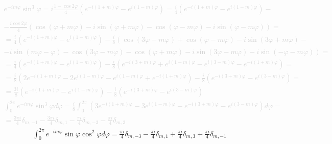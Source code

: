 %
\textcolor{lightgray}{ \begin{equation*} \begin{aligned}
e^{-i m \varphi} \sin^3 \varphi = 
i \frac{1 - \cos 2 \varphi}{4}
\left( e^{-i(1+m)\varphi} - e^{i(1-m)\varphi} \right) = 
\frac{i}{4} \left( e^{-i(1+m)\varphi} - e^{i(1-m)\varphi} \right) - \\
\\ - \frac{i \cos 2 \varphi}{4} \left( 
\cos (\varphi + m \varphi) - i \sin (\varphi + m \varphi) - 
\cos (\varphi - m \varphi) - i \sin (\varphi - m \varphi) \right) = \\
= \frac{i}{4} \left( e^{-i(1+m)\varphi} - e^{i(1-m)\varphi} \right) - 
\frac{i}{8} \left( \cos (3 \varphi + m \varphi) +
\cos (\varphi - m \varphi) - i \sin (3 \varphi + m \varphi) \right. - \\
- \left. i \sin (m \varphi - \varphi) - \cos (3 \varphi - m \varphi) - 
\cos (\varphi + m \varphi) - i \sin (3 \varphi - m \varphi) - 
i \sin (- \varphi - m \varphi) \right) = \\
= \frac{i}{4} \left( e^{-i(1+m)\varphi} - e^{i(1-m)\varphi} \right) - 
\frac{i}{8} \left( e^{-i (3+m) \varphi} + e^{i (1-m) \varphi}
- e^{i (3-m) \varphi} - e^{-i (1+m) \varphi} \right) = \\
= \frac{i}{8} \left( 2 e^{-i(1+m)\varphi} - 2 e^{i(1-m)\varphi} - 
e^{i(1-m)\varphi} + e^{-i(1+m)\varphi} \right) - 
\frac{i}{8} \left( e^{-i (3+m) \varphi} - e^{i (3-m) \varphi} \right) = \\
= \frac{3i}{8} \left( e^{-i(1+m)\varphi} - e^{i(1-m)\varphi} \right) - 
\frac{i}{8} \left( e^{-i (3+m) \varphi} - e^{i (3-m) \varphi} \right)
\end{aligned} \end{equation*} }
%
\textcolor{lightgray}{ \begin{equation*} \begin{aligned}
\int_{0}^{2\pi} e^{-i m \varphi} \sin^3 \varphi d \varphi = 
\frac{i}{8} \int_{0}^{2\pi} 
\left( 3 e^{-i(1+m)\varphi} - 3 e^{i(1-m)\varphi} - 
e^{-i (3+m) \varphi} - e^{i (3-m) \varphi} \right) d \varphi = \\
= \frac{3 \pi i}{4} \delta_{m,-1} - \frac{3 \pi i}{4} \delta_{m,1} - 
\frac{\pi i}{4} \delta_{m,-3} - \frac{\pi i}{4} \delta_{m,3}
\end{aligned} \end{equation*} }
%
\begin{equation} \begin{aligned} \label{eq:int_exp5}
\int_{0}^{2\pi} e^{-i m \varphi} \sin \varphi \cos^2 \varphi d \varphi = 
\frac{\pi i }{4} \delta_{m,-3} - \frac{\pi i }{4} \delta_{m,1} + 
\frac{\pi i }{4} \delta_{m,3} + \frac{\pi i }{4} \delta_{m,-1}
\end{aligned} \end{equation}
